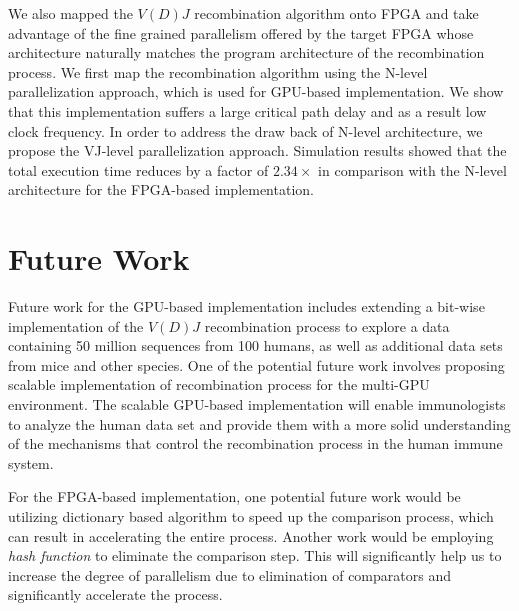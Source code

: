 We also mapped the $V(D)J$ recombination algorithm onto FPGA and take advantage of the fine grained parallelism offered by the target FPGA whose architecture naturally matches the program architecture of the recombination process. We first map the recombination algorithm using the N-level parallelization approach, which is used for GPU-based implementation. We show that this implementation suffers a large critical path delay and as a result low clock frequency. In order to address the draw back of N-level architecture, we propose the VJ-level parallelization approach. Simulation results showed that the total execution time reduces by a factor of $2.34\times$ in comparison with the N-level architecture for the FPGA-based implementation.
\section{Future Work}
Future work for the GPU-based implementation includes extending a bit-wise implementation of the $V(D)J$ recombination process to explore a data containing 50 million sequences from 100 humans, as well as additional data sets from mice and other species. One of the potential future work involves proposing scalable implementation of recombination process for the multi-GPU environment. The scalable GPU-based implementation will enable immunologists to analyze the human data set and provide them with a more solid understanding of the mechanisms that control the recombination process in the human immune system.

For the FPGA-based implementation, one potential future work would be utilizing dictionary based algorithm to speed up the comparison process, which can result in accelerating the entire process. Another work would be employing \emph{hash function} to eliminate the comparison step. This will significantly help us to increase the degree of parallelism due to elimination of comparators and significantly accelerate the process.



